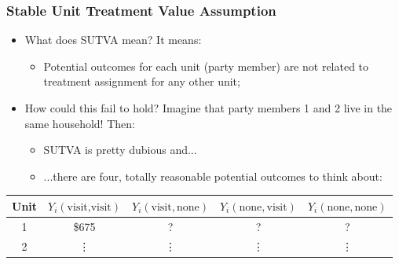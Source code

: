 \documentclass[aspectratio=169]{beamer}
\theoremstyle{principle}
\begin{document}
\begin{frame}
\frametitle{Stable Unit Treatment Value Assumption}
\begin{itemize}
\item What does SUTVA mean?  It means:
\begin{itemize}
\item Potential outcomes for each unit (party member) are not related to treatment assignment for any other unit;
\end{itemize}
\bigskip
\item How could this fail to hold?  Imagine that party members 1 and 2 live in the same household!  Then:
\begin{itemize} 
\item SUTVA is pretty dubious and...
\item ...there are four, totally reasonable potential outcomes to think about:
\end{itemize}
\end{itemize}
\Large
\begin{table}
\begin{tabular}{ c | c | c | c | c}
Unit & $Y_i(\mbox{visit,visit})$ & $Y_i(\mbox{visit},\mbox{none})$ & $Y_i(\mbox{none},\mbox{visit})$ & $Y_i(\mbox{none},\mbox{none})$ \\
\hline
\hline
  1 & \$675 & ? & ? & ? \\
  2 & \vdots & \vdots & \vdots & \vdots \\
\hline
\hline
\end{tabular}
\end{table}

\end{frame}
\end{document}
